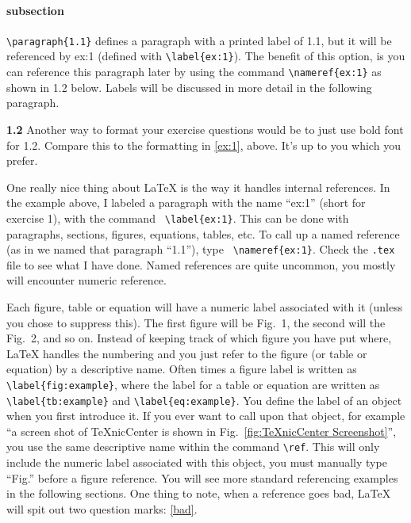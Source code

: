\documentclass[11pt,letterpaper]{article} %
\begin{document}
\paragraph{subsection}
\label{ex:1} \verb|\paragraph{1.1}| defines a paragraph with a printed label of 1.1, but it will be referenced by ex:1 (defined with \verb|\label{ex:1}|). The benefit of this option, is you can reference this paragraph later by using the command \verb|\nameref{ex:1}| as shown in 1.2 below. Labels will be discussed in more detail in the following paragraph.

\textbf{1.2} Another way to format your exercise questions would be to just use bold font for 1.2. Compare this to the formatting in \autoref{ex:1}, above. It's up to you which you prefer.


One really nice thing about \LaTeX{} is the way it handles internal references. In the example above, I labeled a paragraph with the name ``ex:1'' (short for exercise 1), with the command \verb| \label{ex:1}|. This can be done with paragraphs, sections, figures, equations, tables, etc. To call up a named reference (as in we named that paragraph ``1.1''), type \verb| \nameref{ex:1}|. Check the \texttt{.tex} file to see what I have done. Named references are quite uncommon, you mostly will encounter numeric reference. 

Each figure, table or equation will have a numeric label associated with it (unless you chose to suppress this). The first figure will be Fig.~1, the second will the Fig.~2, and so on. Instead of keeping track of which figure you have put where, \LaTeX{} handles the numbering and you just refer to the figure (or table or equation) by a descriptive name. Often times a figure label is written as \verb|\label{fig:example}|, where the label for a table or equation are written as \verb|\label{tb:example}| and \verb|\label{eq:example}|. You define the label of an object when you first introduce it. If you ever want to call upon that object, for example ``a screen shot of \TeX nicCenter is shown in Fig.~\ref{fig:TeXnicCenter Screenshot}'', you use the same descriptive name within the command \verb|\ref|. This will only include the numeric label associated with this object, you must manually type ``Fig.'' before a figure reference. You will see more standard referencing examples in the following sections. One thing to note, when a reference goes bad, \LaTeX{} will spit out two question marks: \ref{bad}.
\end{document}
